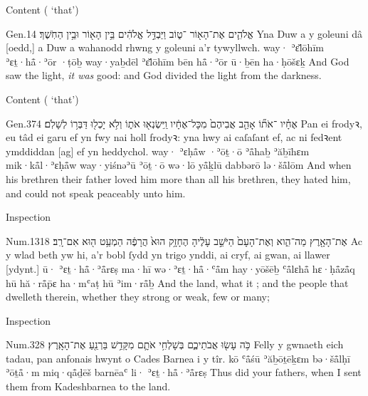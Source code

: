 \begin{frame}{\ex Content ( ‘that’)}
	\begin{example}{Gen.}{1}{4}{}{}
		\quoling
		{ אֱלֹהִ֛ים אֶת־הָא֖וֹר ־ט֑וֹב וַיַּבְדֵּ֣ל אֱלֹהִ֔ים בֵּ֥ין הָא֖וֹר וּבֵ֥ין הַחֹֽשֶׁךְ׃}
		{Yna Duw a  y goleuni  dâ [oedd,] a Duw a wahanodd rhwng y goleuni a’r tywyllwch.}
		{way· ʾɛ̆lōhīm ʾɛṯ·hå̄·ʾōr ·ṭōḇ way·yaḇdēl ʾɛ̆lōhīm bēn hå̄·ʾōr ū·ḇēn ha·ḥōšɛḵ}
		{And God saw the light,  \emph{it was} good: and God divided the light from the darkness.}
	\end{example}
\end{frame}


\begin{frame}{\ex Content ( ‘that’)}
	\begin{example}{Gen.}{37}{4}{}{}
		\quoling
		{ אֶחָ֗יו ־אֹת֞וֹ אָהַ֤ב אֲבִיהֶם֙ מִכָּל־אֶחָ֔יו וַֽיִּשְׂנְא֖וּ אֹת֑וֹ וְלֹ֥א יָכְל֖וּ דַּבְּר֥וֹ לְשָׁלֹֽם׃}
		{Pan  ei frodyꝛ,  eu tâd  ei garu ef yn fwy nai holl frodyꝛ: yna hwy ai caſaſant ef, ac ni fedꝛent ymddiddan [ag] ef yn heddychol.}
		{way· ʾɛḥå̄w ·ʾōṯ·ō ʾå̄haḇ ʾăḇīhɛm mik·kå̄l·ʾɛḥå̄w way·yiśnəʾū ʾōṯ·ō wə·lō yå̄ḵlū dabbərō lə·šå̄lōm}
		{And when his brethren   their father loved him more than all his brethren, they hated him, and could not speak peaceably unto him.}
	\end{example}
\end{frame}


\begin{frame}{\ex Inspection}
	\begin{example}{Num.}{13}{18}{}{}
		\quoling
		{ אֶת־הָאָ֖רֶץ מַה־הִ֑וא וְאֶת־הָעָם֙ הַיֹּשֵׁ֣ב עָלֶ֔יהָ הֶחָזָ֥ק הוּא֙ הֲרָפֶ֔ה הַמְעַ֥ט ה֖וּא אִם־רָֽב׃}
		{Ac  y wlad beth yw hi, a’r bobl ſydd yn trigo ynddi, ai cryf, ai gwan, ai llawer [ydynt.]}
		{ū· ʾɛṯ·hå̄·ʾå̄rɛṣ ma·hī wə·ʾɛṯ·hå̄·ʿå̄m hay·yōšēḇ ʿå̄lɛhå̄ hɛ·ḥå̄zå̄q hū hă·rå̄p̄ɛ ha·mʿaṭ hū ʾim·rå̄ḇ}
		{And  the land, what it ; and the people that dwelleth therein, whether they  strong or weak, few or many;}
	\end{example}
\end{frame}


\begin{frame}{\ex Inspection}
	\begin{example}{Num.}{32}{8}{}{}
		\quoling
		{כֹּ֥ה עָשׂ֖וּ אֲבֹתֵיכֶ֑ם בְּשָׁלְחִ֥י אֹתָ֛ם מִקָּדֵ֥שׁ בַּרְנֵ֖עַ  אֶת־הָאָֽרֶץ׃}
		{Felly y gwnaeth eich tadau, pan anfonais hwynt o Cades Barnea i  y tîr.}
		{kō ʿå̄śū ʾăḇōṯēḵɛm bə·šå̄lḥī ʾōṯå̄·m miq·qå̄ḏēš barnēaʿ li· ʾɛṯ·hå̄·ʾå̄rɛṣ}
		{Thus did your fathers, when I sent them from Kadeshbarnea to  the land.}
	\end{example}
\end{frame}



